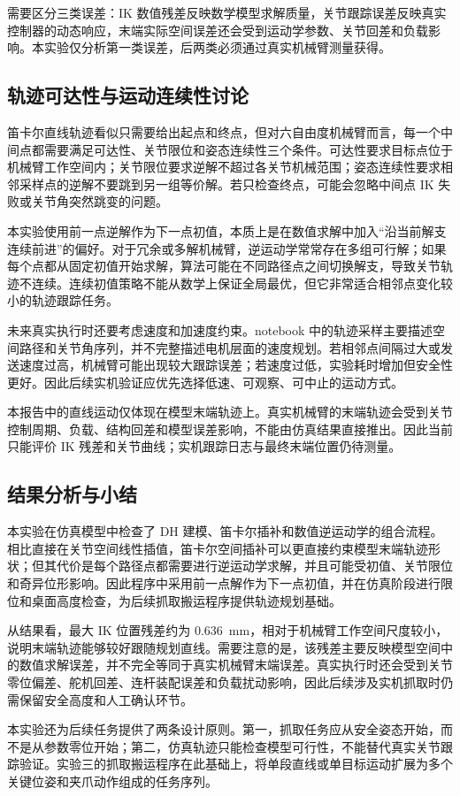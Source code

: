需要区分三类误差：IK 数值残差反映数学模型求解质量，关节跟踪误差反映真实控制器的动态响应，末端实际空间误差还会受到运动学参数、关节回差和负载影响。本实验仅分析第一类误差，后两类必须通过真实机械臂测量获得。

\subsection{轨迹可达性与运动连续性讨论}

笛卡尔直线轨迹看似只需要给出起点和终点，但对六自由度机械臂而言，每一个中间点都需要满足可达性、关节限位和姿态连续性三个条件。可达性要求目标点位于机械臂工作空间内；关节限位要求逆解不超过各关节机械范围；姿态连续性要求相邻采样点的逆解不要跳到另一组等价解。若只检查终点，可能会忽略中间点 IK 失败或关节角突然跳变的问题。

本实验使用前一点逆解作为下一点初值，本质上是在数值求解中加入“沿当前解支连续前进”的偏好。对于冗余或多解机械臂，逆运动学常常存在多组可行解；如果每个点都从固定初值开始求解，算法可能在不同路径点之间切换解支，导致关节轨迹不连续。连续初值策略不能从数学上保证全局最优，但它非常适合相邻点变化较小的轨迹跟踪任务。

未来真实执行时还要考虑速度和加速度约束。notebook 中的轨迹采样主要描述空间路径和关节角序列，并不完整描述电机层面的速度规划。若相邻点间隔过大或发送速度过高，机械臂可能出现较大跟踪误差；若速度过低，实验耗时增加但安全性更好。因此后续实机验证应优先选择低速、可观察、可中止的运动方式。

本报告中的直线运动仅体现在模型末端轨迹上。真实机械臂的末端轨迹会受到关节控制周期、负载、结构回差和模型误差影响，不能由仿真结果直接推出。因此当前只能评价 IK 残差和关节曲线；实机跟踪日志与最终末端位置仍待测量。

\subsection{结果分析与小结}

本实验在仿真模型中检查了 DH 建模、笛卡尔插补和数值逆运动学的组合流程。相比直接在关节空间线性插值，笛卡尔空间插补可以更直接约束模型末端轨迹形状；但其代价是每个路径点都需要进行逆运动学求解，并且可能受初值、关节限位和奇异位形影响。因此程序中采用前一点解作为下一点初值，并在仿真阶段进行限位和桌面高度检查，为后续抓取搬运程序提供轨迹规划基础。

从结果看，最大 IK 位置残差约为 \SI{0.636}{mm}，相对于机械臂工作空间尺度较小，说明末端轨迹能够较好跟随规划直线。需要注意的是，该残差主要反映模型空间中的数值求解误差，并不完全等同于真实机械臂末端误差。真实执行时还会受到关节零位偏差、舵机回差、连杆装配误差和负载扰动影响，因此后续涉及实机抓取时仍需保留安全高度和人工确认环节。

本实验还为后续任务提供了两条设计原则。第一，抓取任务应从安全姿态开始，而不是从参数零位开始；第二，仿真轨迹只能检查模型可行性，不能替代真实关节跟踪验证。实验三的抓取搬运程序在此基础上，将单段直线或单目标运动扩展为多个关键位姿和夹爪动作组成的任务序列。
